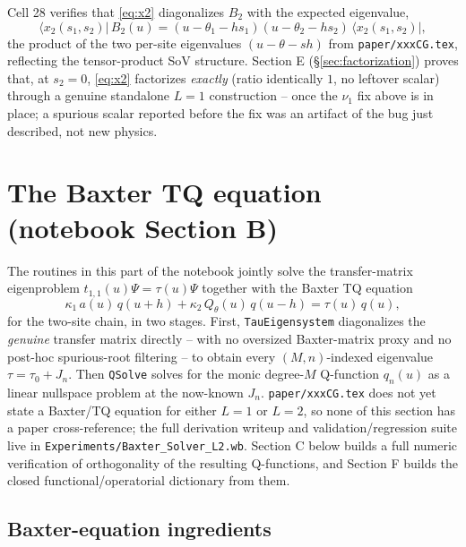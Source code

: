 \documentclass[11pt]{article}
\newcommand{\qth}{Q_\theta}
\begin{document}
Cell 28 verifies that \eqref{eq:x2} diagonalizes $B_2$ with the expected eigenvalue,
\[
  \langle x_2(s_1,s_2)|\, B_2(u) = (u-\theta_1-hs_1)(u-\theta_2-hs_2)\,\langle x_2(s_1,s_2)|,
\]
the product of the two per-site eigenvalues $(u-\theta-sh)$ from \texttt{paper/xxxCG.tex}, reflecting
the tensor-product SoV structure. Section E (\S\ref{sec:factorization}) proves that, at $s_2=0$,
\eqref{eq:x2} factorizes \emph{exactly} (ratio identically $1$, no leftover scalar) through a
genuine standalone $L=1$ construction -- once the $\nu_1$ fix above is in place; a spurious
scalar reported before the fix was an artifact of the bug just described, not new physics.

\section{The Baxter TQ equation (notebook Section B)}
\label{sec:baxter}

The routines in this part of the notebook jointly solve the transfer-matrix eigenproblem
$t_{1,1}(u)\Psi=\tau(u)\Psi$ together with the Baxter TQ equation
\begin{equation}
  \kappa_1\,a(u)\,q(u+h) + \kappa_2\,\qth(u)\,q(u-h) = \tau(u)\,q(u),
  \label{eq:TQ}
\end{equation}
for the two-site chain, in two stages. First, \texttt{TauEigensystem} diagonalizes the
\emph{genuine} transfer matrix directly -- with no oversized Baxter-matrix proxy and no post-hoc
spurious-root filtering -- to obtain every $(M,n)$-indexed eigenvalue $\tau=\tau_0+J_n$. Then
\texttt{QSolve} solves for the monic degree-$M$ Q-function $q_n(u)$ as a linear nullspace problem at
the now-known $J_n$. \texttt{paper/xxxCG.tex} does not yet state a Baxter/TQ equation for either
$L=1$ or $L=2$, so none of this section has a paper cross-reference; the full derivation writeup
and validation/regression suite live in \texttt{Experiments/Baxter\_Solver\_L2.wb}. Section C below
builds a full numeric verification of orthogonality of the resulting Q-functions, and Section F
builds the closed functional/operatorial dictionary from them.

\subsection*{Baxter-equation ingredients}
\end{document}
